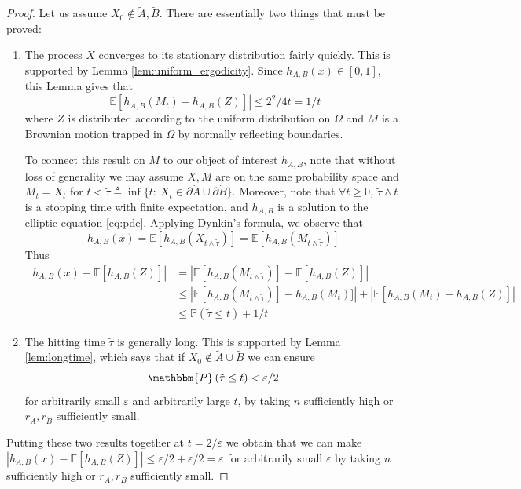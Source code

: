 \documentclass[nofootinbib,english, aip, jcp, priprint, graphicx,floatfix]{revtex4-1}
\theoremstyle{plain}
\theoremstyle{definition}
\theoremstyle{plain}
\begin{document}
\begin{proof}
Let us assume $X_0 \notin \tilde A,\tilde B$.  There are essentially two things that must be proved:
\begin{enumerate}
\item The process $X$ converges to its stationary distribution fairly quickly.  This is supported by Lemma \ref{lem:uniform_ergodicity}.  Since $h_{A,B}(x) \in [0,1]$, this Lemma gives that
%
\[
|\mathbb{E}[h_{A,B}(M_t)-h_{A,B}(Z)]| \leq 2^2/4t =1/t
\]
%
where $Z$ is distributed according to the uniform distribution on $\Omega$ and $M$ is a Brownian motion trapped in $\Omega$ by normally reflecting boundaries.  

To connect this result on $M$ to our object of interest $h_{A,B}$, note that without loss of generality we may assume $X,M$ are on the same probability space and $M_t=X_t$ for $t<\tilde\tau \triangleq \inf \{t:\ X_t \in \partial \dot A \cup \partial \dot B\}$.  Moreover, note that $\forall t \geq 0$, $\tilde\tau\wedge t$ is a stopping time with finite expectation, and $h_{A,B}$ is a solution to the elliptic equation \ref{eq:pde}. Applying Dynkin's formula, we observe that 
%
\[
h_{A,B}(x) = \mathbb{E} [h_{A,B}(X_{t\wedge\tilde\tau})] = \mathbb{E} [h_{A,B}(M_{t\wedge\tilde\tau})]
\]
%
Thus
\begin{align*}
|h_{A,B}(x) - \mathbb{E}[h_{A,B}(Z)]| &= |\mathbb{E} [h_{A,B}(M_{t\wedge\tilde\tau})] - \mathbb{E}[h_{A,B}(Z)]|\\
&\leq |\mathbb{E} [h_{A,B}(M_{t\wedge\tilde\tau})] - h_{A,B}(M_t)]| + |\mathbb{E} [h_{A,B}(M_{t}) - h_{A,B}(Z)]|\\
&\leq \mathbb{P}(\tilde \tau \leq t) + 1/t
\end{align*}
%

\item The hitting time $\tilde \tau$ is generally long.  This is supported by Lemma \ref{lem:longtime}, which says that if $X_0 \not\in\tilde{A} \cup \tilde{B}$ we can ensure
%
\[
\mathbbm{P} \left( \tilde{\tau} \leq t \right) < \varepsilon/2
\]
%
for arbitrarily small $\varepsilon$ and arbitrarily large $t$, by taking $n$ sufficiently high or $r_{\dot A},r_{\dot B}$ sufficiently small.
\end{enumerate}
Putting these two results together at $t=2/\varepsilon$ we obtain that we can make $|h_{A,B}(x) - \mathbb{E}[h_{A,B}(Z)]| \leq \varepsilon / 2 + \varepsilon/2 = \varepsilon$ for arbitrarily small $\varepsilon$ by taking $n$ sufficiently high or $r_{\dot A},r_{\dot B}$ sufficiently small.
\end{proof}
\end{document}
